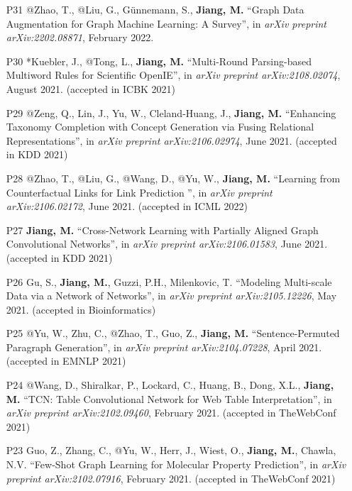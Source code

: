 \documentclass[10pt]{article}
\newenvironment{myindentpar}[1]%
{\begin{list}{}%
         {\setlength{\leftmargin}{#1}}%
         \item[]%
}
{\end{list}}
\newcounter{list}
\begin{document}
\begin{myindentpar}{0.00cm}
{\begin{enumerate}[leftmargin=.5cm]
\item[P31] @Zhao, T., @Liu, G., Günnemann, S., \textbf{Jiang, M.} ``Graph Data Augmentation for Graph Machine Learning: A Survey'', in \textit{arXiv preprint arXiv:2202.08871}, February 2022.
		
\item[P30] *Kuebler, J., @Tong, L., \textbf{Jiang, M.} ``Multi-Round Parsing-based Multiword Rules for Scientific OpenIE'', in \textit{arXiv preprint arXiv:2108.02074}, August 2021. (accepted in ICBK 2021)

\item[P29] @Zeng, Q., Lin, J., Yu, W., Cleland-Huang, J., \textbf{Jiang, M.} ``Enhancing Taxonomy Completion with Concept Generation via Fusing Relational Representations'', in \textit{arXiv preprint arXiv:2106.02974}, June 2021. (accepted in KDD 2021)

\item[P28] @Zhao, T., @Liu, G., @Wang, D., @Yu, W., \textbf{Jiang, M.} ``Learning from Counterfactual Links for Link Prediction '', in \textit{arXiv preprint arXiv:2106.02172}, June 2021. (accepted in ICML 2022)

\item[P27] \textbf{Jiang, M.} ``Cross-Network Learning with Partially Aligned Graph Convolutional Networks'', in \textit{arXiv preprint arXiv:2106.01583}, June 2021. (accepted in KDD 2021)

\item[P26] Gu, S., \textbf{Jiang, M.}, Guzzi, P.H., Milenkovic, T. ``Modeling Multi-scale Data via a Network of Networks'', in \textit{arXiv preprint arXiv:2105.12226}, May 2021. (accepted in Bioinformatics)

\item[P25] @Yu, W., Zhu, C., @Zhao, T., Guo, Z., \textbf{Jiang, M.} ``Sentence-Permuted Paragraph Generation'', in \textit{arXiv preprint arXiv:2104.07228}, April 2021. (accepted in EMNLP 2021)

\item[P24] @Wang, D., Shiralkar, P., Lockard, C., Huang, B., Dong, X.L., \textbf{Jiang, M.} ``TCN: Table Convolutional Network for Web Table Interpretation'', in \textit{arXiv preprint arXiv:2102.09460}, February 2021. (accepted in TheWebConf 2021)

\item[P23] Guo, Z., Zhang, C., @Yu, W., Herr, J., Wiest, O., \textbf{Jiang, M.}, Chawla, N.V. ``Few-Shot Graph Learning for Molecular Property Prediction'', in \textit{arXiv preprint arXiv:2102.07916}, February 2021. (accepted in TheWebConf 2021)


\end{enumerate}}
\end{myindentpar}
\end{document}
